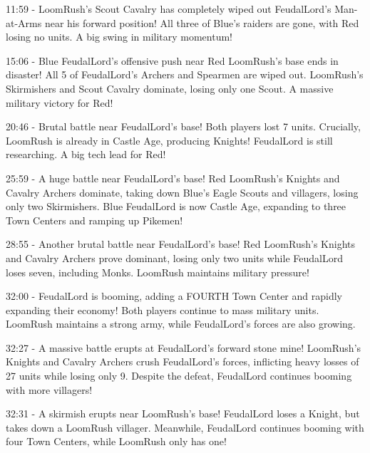 11:59 - LoomRush's Scout Cavalry has completely wiped out FeudalLord's Man-at-Arms near his forward position! All three of Blue's raiders are gone, with Red losing no units. A big swing in military momentum! \par \vspace{1em}

15:06 - Blue FeudalLord's offensive push near Red LoomRush's base ends in disaster! All 5 of FeudalLord's Archers and Spearmen are wiped out. LoomRush's Skirmishers and Scout Cavalry dominate, losing only one Scout. A massive military victory for Red! \par \vspace{1em}

20:46 - Brutal battle near FeudalLord's base! Both players lost 7 units. Crucially, LoomRush is already in Castle Age, producing Knights! FeudalLord is still researching. A big tech lead for Red! \par \vspace{1em}

25:59 - A huge battle near FeudalLord's base! Red LoomRush's Knights and Cavalry Archers dominate, taking down Blue's Eagle Scouts and villagers, losing only two Skirmishers. Blue FeudalLord is now Castle Age, expanding to three Town Centers and ramping up Pikemen! \par \vspace{1em}

28:55 - Another brutal battle near FeudalLord's base! Red LoomRush's Knights and Cavalry Archers prove dominant, losing only two units while FeudalLord loses seven, including Monks. LoomRush maintains military pressure! \par \vspace{1em}

32:00 - FeudalLord is booming, adding a FOURTH Town Center and rapidly expanding their economy! Both players continue to mass military units. LoomRush maintains a strong army, while FeudalLord's forces are also growing. \par \vspace{1em}

32:27 - A massive battle erupts at FeudalLord's forward stone mine! LoomRush's Knights and Cavalry Archers crush FeudalLord's forces, inflicting heavy losses of 27 units while losing only 9. Despite the defeat, FeudalLord continues booming with more villagers! \par \vspace{1em}

32:31 - A skirmish erupts near LoomRush's base! FeudalLord loses a Knight, but takes down a LoomRush villager. Meanwhile, FeudalLord continues booming with four Town Centers, while LoomRush only has one! \par \vspace{1em}

